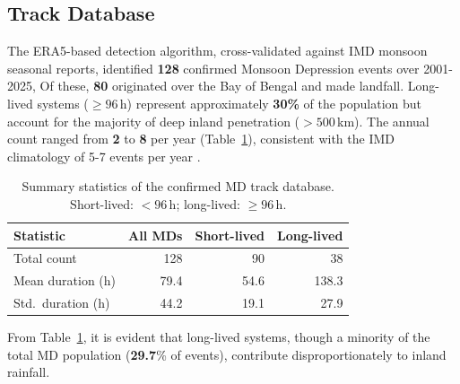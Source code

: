 \subsection{Track Database}
\label{subsec:track_database}

The ERA5-based detection algorithm, cross-validated against IMD
monsoon seasonal reports, identified \textbf{128} confirmed Monsoon
Depression events over 2001-2025, Of these, \textbf{80} originated
over the Bay of Bengal and made landfall. Long-lived systems ($\geq
96$\,h) represent approximately \textbf{30\%} of the population but
account for the majority of deep inland penetration ($> 500$\,km).
The annual count ranged from \textbf{2} to \textbf{8} per year
(Table~\ref{tab:track_stats}), consistent with the IMD climatology of
5-7 events per year \autocite{kishtawal2013enhancement}.

\begin{table}[H]
  \centering
  \caption[MD track database statistics (2001-2025)]{Summary statistics of the
  confirmed MD track database. Short-lived: $<96$\,h; long-lived: $\geq 96$\,h.}
  \label{tab:track_stats}
  \begin{tabular}{l r r r}
    \toprule
    \textbf{Statistic}                      & \textbf{All MDs} &
    \textbf{Short-lived} & \textbf{Long-lived} \\
    \midrule
    Total count                             & 128              &
    90                   & 38                  \\
    Mean duration (h)                       & 79.4             & 54.6
    & 138.3                \\
    Std.\ duration (h)                      & 44.2             & 19.1
    & 27.9                 \\
    \bottomrule
  \end{tabular}
\end{table}

From Table~\ref{tab:track_stats}, it is evident that long-lived
systems, though a minority of the total MD population
(\textbf{29.7}\% of events), contribute disproportionately to inland rainfall.

